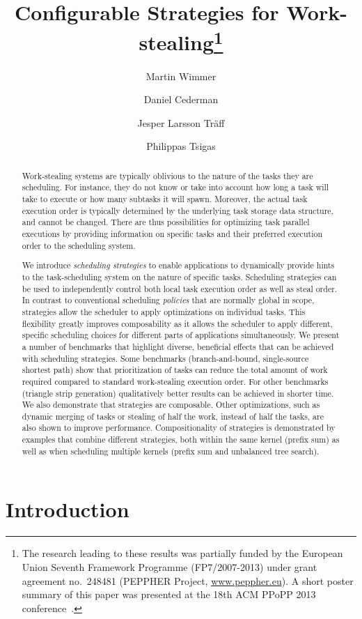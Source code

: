 \documentclass[a4paper,11pt]{article}
\title{Configurable Strategies for Work-stealing\thanks{The
research leading to these results was partially funded by the
European Union Seventh Framework Programme (FP7/2007-2013)
under grant agreement no.\ 248481 (PEPPHER Project, \protect\url{www.peppher.eu}). A short poster summary of this paper was presented at the 18th ACM PPoPP 2013 conference~\cite{ppopp13}.}
}
\author[1]{Martin Wimmer}
\author[2]{Daniel Cederman}
\author[1]{Jesper Larsson Tr{\"a}ff}
\author[2]{Philippas Tsigas}
\affil[1]{Faculty of Informatics\\Vienna University of Technology\\
Favoritenstrasse 16, 1040 Vienna, Austria\\ \texttt{\{wimmer,traff\}@par.tuwien.ac.at}}
\affil[2]{Computer Science and Engineering\\Chalmers University of Technology\\
412 96 G\"oteborg, Sweden\\ \texttt{\{cederman,tsigas\}@chalmers.se}}
\begin{document}
\maketitle

\begin{abstract}
Work-stealing systems are typically oblivious to the nature of the
tasks they are scheduling. For instance, they do not know or take into
account how long a task will take to execute or how many subtasks it
will spawn.  Moreover, the actual task execution order is typically
determined by the underlying task storage data structure, and cannot
be changed.  There are thus possibilities for optimizing task parallel
executions by providing information on specific tasks and their
preferred execution order to the scheduling system.

We introduce \emph{scheduling strategies} to enable applications to
dynamically provide hints to the task-scheduling system on the nature
of specific tasks.  Scheduling strategies can be used to independently
control both local task execution order as well as steal order. In
contrast to conventional scheduling \emph{policies} that are normally
global in scope, strategies allow the scheduler to apply optimizations
on individual tasks.  This flexibility greatly improves composability
as it allows the scheduler to apply different, specific scheduling
choices for different parts of applications simultaneously.  We
present a number of benchmarks that highlight diverse, beneficial
effects that can be achieved with scheduling strategies. Some
benchmarks (branch-and-bound, single-source shortest path) show that
prioritization of tasks can reduce the total amount of work required
compared to standard work-stealing execution order. For other
benchmarks (triangle strip generation) qualitatively better results
can be achieved in shorter time. We also demonstrate that strategies
are composable.  Other optimizations, such as dynamic merging of tasks
or stealing of half the work, instead of half the tasks, are also
shown to improve performance.  Compositionality of strategies is
demonstrated by examples that combine different strategies, both
within the same kernel (prefix sum) as well as when scheduling
multiple kernels (prefix sum and unbalanced tree search).
\end{abstract}

\section{Introduction}
\end{document}
